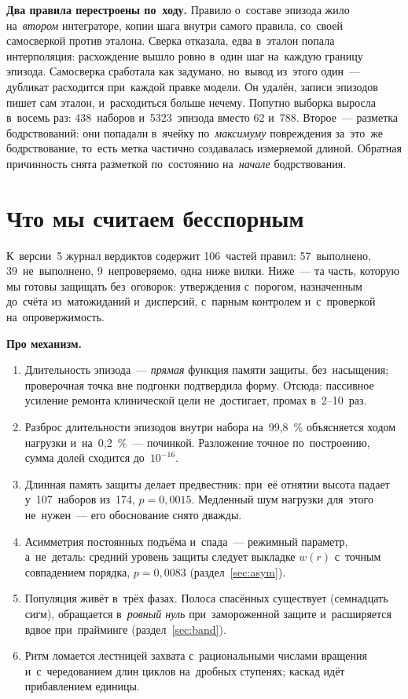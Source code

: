 \documentclass[11pt,a4paper,landscape,twocolumn]{article}
\begin{document}
\textbf{Два правила перестроены по~ходу.} Правило о~составе эпизода жило на~\emph{втором} интеграторе, копии шага внутри самого правила, со~своей самосверкой против эталона. Сверка отказала, едва в~эталон попала интерполяция: расхождение вышло ровно в~один шаг на~каждую границу эпизода. Самосверка сработала как задумано, но~вывод из~этого один~— дубликат расходится при~каждой правке модели. Он удалён, записи эпизодов пишет сам эталон, и~расходиться больше нечему. Попутно выборка выросла в~восемь раз: 438~наборов и~5323~эпизода вместо 62 и~788. Второе~— разметка бодрствований: они попадали в~ячейку по~\emph{максимуму} повреждения за~это~же бодрствование, то~есть метка частично создавалась измеряемой длиной. Обратная причинность снята разметкой по~состоянию на~\emph{начале} бодрствования.

\section{Что мы считаем бесспорным}\label{sec:solid}
К~версии~5 журнал вердиктов содержит 106~частей правил: 57~выполнено, 39~не~выполнено, 9~непроверяемо, одна ниже вилки. Ниже~— та часть, которую мы готовы защищать без~оговорок: утверждения с~порогом, назначенным до~счёта из~матожиданий и~дисперсий, с~парным контролем и~с~проверкой на~опровержимость.

\textbf{Про механизм.}
\begin{enumerate}[leftmargin=1.3em,itemsep=2pt,topsep=2pt]
\item Длительность эпизода~— \emph{прямая} функция памяти защиты, без~насыщения; проверочная точка вне подгонки подтвердила форму. Отсюда: пассивное усиление ремонта клинической цели не~достигает, промах в~2–10~раз.
\item Разброс длительности эпизодов внутри набора на~99,8~\% объясняется ходом нагрузки и~на~0,2~\%~— починкой. Разложение точное по~построению, сумма долей сходится до~$10^{-16}$.
\item Длинная память защиты делает предвестник: при~её отнятии высота падает у~107~наборов из~174, $p=0{,}0015$. Медленный шум нагрузки для~этого не~нужен~— его обоснование снято дважды.
\item Асимметрия постоянных подъёма и~спада~— режимный параметр, а~не~деталь: средний уровень защиты следует выкладке $w(r)$ с~точным совпадением порядка, $p=0{,}0083$ (раздел~\ref{sec:asym}).
\item Популяция живёт в~трёх фазах. Полоса спасённых существует (семнадцать сигм), обращается в~\emph{ровный нуль} при~замороженной защите и~расширяется вдвое при~прайминге (раздел~\ref{sec:band}).
\item Ритм ломается лестницей захвата с~рациональными числами вращения и~с~чередованием длин циклов на~дробных ступенях; каскад идёт прибавлением единицы.
\end{enumerate}
\end{document}
